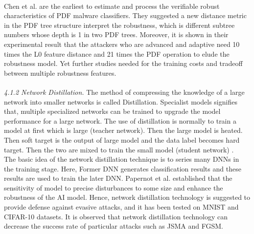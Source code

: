 \documentclass{article}
\begin{document}
\\
Chen et al. \cite{chen2020training} are the earliest to estimate and process the verifiable robust characteristics of PDF malware classifiers. They suggested a new distance metric in the PDF tree structure interpret the robustness, which is different subtree numbers whose depth is 1 in two PDF trees. Moreover, it is shown in their experimental result that the attackers who are advanced and adaptive need 10 times the L0 feature distance and 21 times the PDF operation to elude the robustness model. Yet further studies needed for the training costs and tradeoff between multiple robustness features.
\\\\
\textit{4.1.2 Network Distillation.}
The method of compressing the knowledge of a large network into smaller networks is called Distillation. Specialist models signifies that, multiple specialized networks can be trained to upgrade the model performance for a large network. The use of distillation is normally to train a model at first which is large (teacher network).  Then the large model is heated. Then soft target is the output of large model and the data label becomes hard target. Then the two are mixed to train the small model (student network) \cite{zhang2019adversarial}.
\\
The basic idea of the network distillation technique is to series many DNNs in the training stage. Here, Former DNN generates classification results and these results are used to train the later DNN. Papernot et al. \cite{papernot2016distillation} established that the sensitivity of model to precise disturbances to some size and enhance the robustness of the AI model. Hence, network distillation technology is suggested to provide defense against evasive attacks, and it has been tested on MNIST and CIFAR-10 datasets. It is observed that network distillation technology can decrease the success rate of particular attacks such as JSMA and FGSM.
\end{document}

